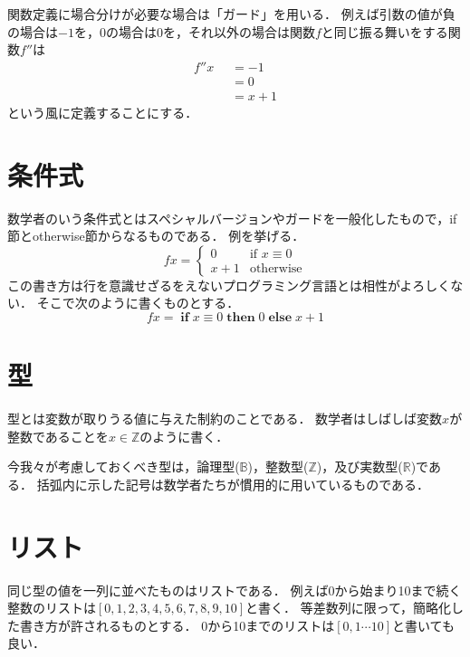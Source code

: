 \documentclass[twocolumn]{jsbook}
\newcommand{\guard}[1]{\mathop{\mid_{{#1}}}}
\newcommand{\mathif}{\mathop{\textbf{if}}}
\newcommand{\mathelse}{\mathop{\textbf{else}}}
\newcommand{\maththen}{\mathop{\textbf{then}}}
\begin{document}
関数定義に場合分けが必要な場合は「ガード」を用いる．
例えば引数の値が負の場合は$-1$を，$0$の場合は$0$を，それ以外の場合は関数$f$と同じ振る舞いをする関数$f''$は
\begin{equation}
\begin{split}
f''x&\guard{x<0}=-1\\
&\guard{x\equiv0}=0\\
&\guard{\text{otherwise}}=x+1
\end{split}
\end{equation}
という風に定義することにする．

\section{条件式}

数学者のいう条件式とはスペシャルバージョンやガードを一般化したもので，if節とotherwise節からなるものである．
例を挙げる．
\begin{equation}
fx=\begin{cases}
0&\text{if $x\equiv0$}\\
x+1&\text{otherwise}
\end{cases}
\end{equation}
この書き方は行を意識せざるをえないプログラミング言語とは相性がよろしくない．
そこで次のように書くものとする．
\begin{equation}
fx=\mathif x\equiv0\maththen0\mathelse x+1
\end{equation}


\section{型}

型とは変数が取りうる値に与えた制約のことである．
数学者はしばしば変数$x$が整数であることを$x\in\mathbb{Z}$のように書く．

今我々が考慮しておくべき型は，論理型($\mathbb{B}$)，整数型($\mathbb{Z}$)，及び実数型($\mathbb{R}$)である．
括弧内に示した記号は数学者たちが慣用的に用いているものである．

\section{リスト}

同じ型の値を一列に並べたものはリストである．
例えば0から始まり10まで続く整数のリストは$[0,1,2,3,4,5,6,7,8,9,10]$と書く．
等差数列に限って，簡略化した書き方が許されるものとする．
0から10までのリストは$[0,1\dotsb10]$と書いても良い．
\end{document}
